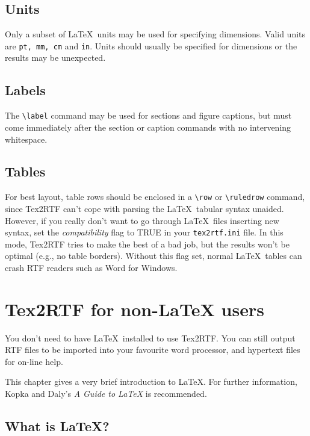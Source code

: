 \subsection{Units}%

Only a subset of \LaTeX\ units may be used for specifying dimensions.
Valid units are {\tt pt, mm, cm} and {\tt in}. Units should usually
be specified for dimensions or the results may be unexpected.

\subsection{Labels}%

The \verb$\label$ command may be used for sections and figure captions,
but must come immediately after the section or caption commands with no
intervening whitespace.

\subsection{Tables}\label{tables}%

For best layout, table rows should be enclosed in a \verb$\row$\rtfsp
or \verb$\ruledrow$ command, since Tex2RTF can't cope with parsing
the \LaTeX\ tabular syntax unaided. However, if you really don't want
to go through \LaTeX\ files inserting new syntax, set the {\it compatibility}\rtfsp
flag to TRUE in your {\tt tex2rtf.ini} file. In this mode, Tex2RTF tries to make
the best of a bad job, but the results won't be optimal (e.g., no table
borders). Without this flag set, normal \LaTeX\ tables can crash RTF readers
such as Word for Windows.

\section{Tex2RTF for non-LaTeX users}%

You don't need to have \LaTeX\ installed to use Tex2RTF. You
can still output RTF files to be imported into your favourite
word processor, and hypertext files for on-line help.

This chapter gives a very brief introduction to \LaTeX. For further
information, Kopka and Daly's {\it A Guide to \LaTeX} \cite{kopka} is
recommended.

\subsection{What is \LaTeX?}

